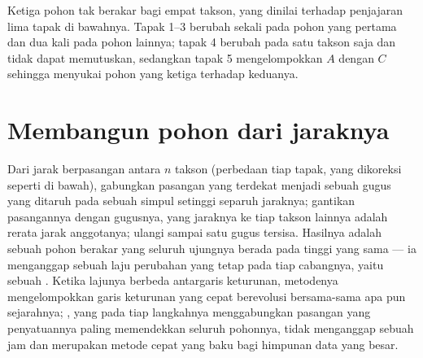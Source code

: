 \begin{omfigure}

{\small Ketiga pohon tak berakar bagi empat takson, yang dinilai
terhadap penjajaran lima tapak di bawahnya. Tapak 1--3 berubah sekali
pada pohon yang pertama dan dua kali pada pohon lainnya; tapak 4
berubah pada satu takson saja dan tidak dapat memutuskan, sedangkan
tapak 5 mengelompokkan $A$ dengan $C$ sehingga menyukai pohon yang
ketiga terhadap keduanya.}
\end{omfigure}

\section{Membangun pohon dari jaraknya}

\begin{method}\label{meth:b2:phylogenetic-trees:upgma}
Dari jarak berpasangan antara $n$ takson (perbedaan tiap tapak, yang
dikoreksi seperti di bawah), gabungkan pasangan yang terdekat menjadi
sebuah gugus yang ditaruh pada sebuah simpul setinggi separuh jaraknya;
gantikan pasangannya dengan gugusnya, yang jaraknya ke tiap takson
lainnya adalah rerata jarak anggotanya; ulangi sampai satu gugus
tersisa. Hasilnya adalah sebuah pohon berakar yang seluruh ujungnya
berada pada tinggi yang sama --- ia menganggap sebuah laju perubahan
yang tetap pada tiap cabangnya, yaitu sebuah . Ketika lajunya
berbeda antargaris keturunan, metodenya mengelompokkan garis keturunan
yang cepat berevolusi bersama-sama apa pun sejarahnya;
\emph{}, yang pada tiap langkahnya menggabungkan
pasangan yang penyatuannya paling memendekkan seluruh pohonnya, tidak
menganggap sebuah jam dan merupakan metode cepat yang baku bagi
himpunan data yang besar.
\end{method}

